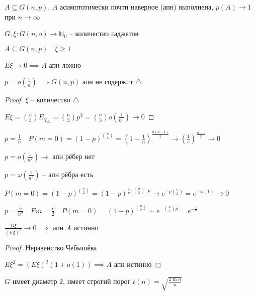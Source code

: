 \documentclass{book}
\newcommand\N{\ensuremath{\mathbb{N}}}
\theoremstyle{definition}
\begin{document}
 \begin{theorem}
     $A \subseteq G(n, p)$. $A$ асимптотически почти наверное (апн) выполнена, $p(A) \to 1$ при $n\to \infty $
\end{theorem}

$G, \xi: G(n, o) \to \N_0 $ -- количество гаджетов

$A \subseteq G(n, p)\quad \xi \geqslant 1$

\begin{lemma}
    $E\xi \to 0 \implies A$ апн ложно
\end{lemma}


\begin{statement}
    $p = o\left(\frac{1}{n}  \right) \implies G(n, p)$ апн не содержит $\triangle$
\end{statement}
\begin{proof}
    $\xi$ -- количество  $\triangle$

    $E\xi = {n\choose 3} E_{\chi_{\triangle}} = {n\choose 3} p^3 = {n\choose 3} o\left( \frac{1}{n^3} \right) \to 0$
\end{proof}

$p = \frac{1}{n}\quad P(m=0) = (1-p)^{n\choose 2} = \left( 1 - \frac{1}{n} \right) ^{\frac{n(n-1)}{2}} \to  \left( \frac{1}{e} \right) ^{\frac{n-1}{2}} \to 0$

$p = o\left( \frac{1}{n^2} \right) \to $ апн рёбер нет

$p = \omega\left( \frac{1}{n^2} \right) $ -- апн рёбра есть

$P(m=0) = \left( 1-p \right) ^{n\choose 2} = \left( 1-p \right) ^{\frac{1}{p}\cdot {n\choose 2}\cdot p} \to e^{-p {n\choose 2}} = e^{-\omega(1)} \to 0$

$p = \frac{c}{n^2}\quad Em = \frac{c}{2}\quad P(m=0) = (1-p)^{n\choose 2}\sim e^{- {n\choose 2}p} = e^{-\frac{c}{2}}$

\begin{lemma}

    $\frac{D\xi}{\left( E\xi \right) ^2}\to 0\implies $ апн $A$ истинно
\end{lemma}
\begin{proof}
    Неравенство Чебышёва

    $E\xi^2 = \left( E\xi \right) ^2\left( 1 + o(1) \right)  \implies A$ апн истинно
\end{proof}

\begin{theorem}
    $G$ имеет диаметр 2, имеет строгий порог  $t(n) = \sqrt{\frac{2\ln n}{n}} $
\end{theorem}
\end{document}
